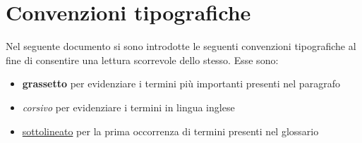 %
%
\section{Convenzioni tipografiche}
\label{abs-hightlighting}
Nel seguente documento si sono introdotte le seguenti convenzioni tipografiche al fine di consentire una lettura scorrevole dello stesso. Esse sono:

\begin{itemize}
\item{\textbf{grassetto} per evidenziare i termini più importanti presenti nel paragrafo}
\item{\textit{corsivo} per evidenziare i termini in lingua inglese}
\item{\underline{sottolineato} per la prima occorrenza di termini presenti nel glossario}
\end{itemize}